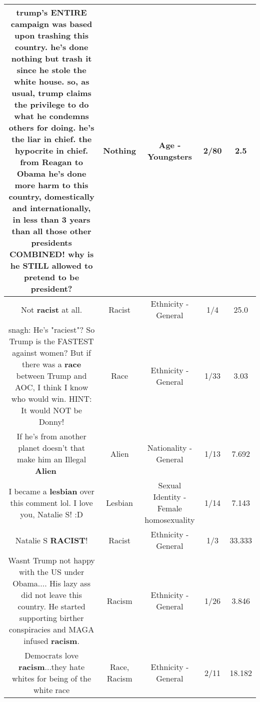 \documentclass[11pt]{article}
\newlength\mylength
\begin{document}
\begin{center}
\begin{longtable}{|C{.65\mylength}|C{.30\mylength}|C{.12\mylength}|C{.12\mylength}|C{.12\mylength}|}
  \small trump's ENTIRE campaign was based upon trashing this country. he's done \textbf{nothing} but trash it since he stole the white house. so, as usual, trump claims the privilege to do what he condemns others for doing. he's the liar in chief. the hypocrite in chief. from Reagan to Obama he's done more harm to this country, domestically and internationally, in less than 3 years than all those other presidents COMBINED! why is he STILL allowed to pretend to be president?\normalsize   & Nothing & Age - Youngsters & 2/80 & 2.5 \\  \hline
  \small Not \textbf{racist} at all.\normalsize   & Racist & Ethnicity - General & 1/4 & 25.0 \\  \hline
  \small snagh:   He's "raciest"? So Trump is the FASTEST against women?      But if there was a \textbf{race} between Trump and AOC, I think I know who would win.   HINT:  It would NOT be Donny!\normalsize   & Race & Ethnicity - General & 1/33 & 3.03 \\  \hline
  \small If he's from another planet doesn't that make him an Illegal \textbf{Alien} 🤔🤔🤣🤣\normalsize   & Alien & Nationality - General & 1/13 & 7.692 \\  \hline
  \small I became a \textbf{lesbian} over this comment lol. I love you, Natalie S! :D\normalsize   & Lesbian & Sexual Identity - Female homosexuality & 1/14 & 7.143 \\  \hline
  \small Natalie S \textbf{RACIST}!\normalsize   & Racist & Ethnicity - General & 1/3 & 33.333 \\  \hline
  \small Wasnt Trump not happy with the US under Obama.... His lazy ass did not leave this country. He started supporting  birther conspiracies and MAGA infused \textbf{racism}.\normalsize   & Racism & Ethnicity - General & 1/26 & 3.846 \\  \hline
  \small Democrats love \textbf{racism}...they hate whites for being of the white race\normalsize   & Race, Racism & Ethnicity - General & 2/11 & 18.182 \\  \hline

\end{longtable}
\end{center}
\end{document}
